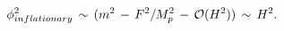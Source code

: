 \begin{equation}
\label{vevinf}
\phi^2_{inflationary} \, \sim \, ( m^2 \, -\, F^2/
M_p^2 \, - \, {\cal O}(H^2)) \, \sim \, H^2.
\end{equation}

